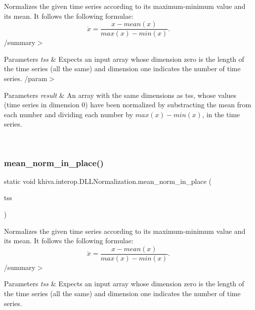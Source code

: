 Normalizes the given time series according to its maximum-\/minimum value and its mean. It follows the following formulae\+: \[ \acute{x} = \frac{x - mean(x)}{max(x) - min(x)}. \] /summary$>$ 
\begin{DoxyParams}{Parameters}
{\em tss} & Expects an input array whose dimension zero is the length of the time series (all the same) and dimension one indicates the number of time series. /param$>$ 
\begin{DoxyParams}{Parameters}
{\em result} & An array with the same dimensions as tss, whose values (time series in dimension 0) have been normalized by substracting the mean from each number and dividing each number by $ max(x) - min(x)$, in the time series.\\
\hline
\end{DoxyParams}
\\
\hline
\end{DoxyParams}


\mbox{\label{classkhiva_1_1interop_1_1_d_l_l_normalization_a4a3c01d6d03e465f4e3afce9e2cfe2d9}} 
\subsubsection{\texorpdfstring{mean\+\_\+norm\+\_\+in\+\_\+place()}{mean\_norm\_in\_place()}}
{\footnotesize\ttfamily static void khiva.\+interop.\+D\+L\+L\+Normalization.\+mean\+\_\+norm\+\_\+in\+\_\+place (\begin{DoxyParamCaption}\item[{\mbox{[}\+In, Out\mbox{]} ref Int\+Ptr}]{tss }\end{DoxyParamCaption})\hspace{0.3cm}{\ttfamily [static]}}



Normalizes the given time series according to its maximum-\/minimum value and its mean. It follows the following formulae\+: \[ \acute{x} = \frac{x - mean(x)}{max(x) - min(x)}. \] /summary$>$ 
\begin{DoxyParams}{Parameters}
{\em tss} & Expects an input array whose dimension zero is the length of the time series (all the same) and dimension one indicates the number of time series.\\
\hline
\end{DoxyParams}


